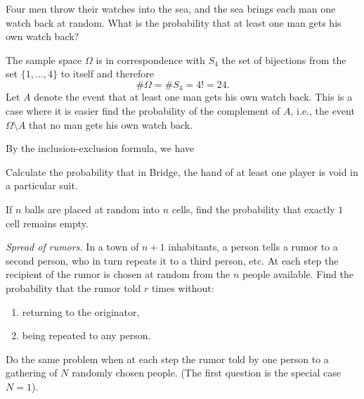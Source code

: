 \begin{problem}[Handout 2, \# 5]
  Four men throw their watches into the sea, and the sea brings each man
  one watch back at random. What is the probability that at least one man
  gets his own watch back?
\end{problem}
\begin{solution}
  The sample space \(\Omega\) is in correspondence with \(S_4\) the set of
  bijections from the set \(\{1,\dotsc,4\}\) to itself and therefore
  \begin{equation}
    \label{eq:2-1}
    \#\Omega=\# S_4=4!=24.
  \end{equation}
  Let \(A\) denote the event that at least one man gets his own watch
  back. This is a case where it is easier find the probability of the
  complement of \(A\), i.e., the event \(\Omega\setminus A\) that no man
  gets his own watch back.

  By the inclusion-exclusion formula, we have
\end{solution}
\newpage

\begin{problem}[Handout 2, \#7]
  Calculate the probability that in Bridge, the hand of at least one player
  is void in a particular suit.
\end{problem}
\begin{solution}
\end{solution}
\newpage

\begin{problem}[Handout 2, \# 12]
  If \(n\) balls are placed at random into \(n\) cells, find the
  probability that exactly \(1\) cell remains empty.
\end{problem}
\begin{solution}
\end{solution}
\newpage


\begin{problem}[Handout 2, \# 13]
  \emph{Spread of rumors.} In a town of \(n+1\) inhabitants, a person tells
  a rumor to a second person, who in turn repeats it to a third person,
  etc. At each step the recipient of the rumor is chosen at random from the
  \(n\) people available. Find the probability that the rumor told \(r\)
  times without:
  \begin{enumerate}[label=(\alph*),noitemsep]
  \item returning to the originator,
  \item being repeated to any person.
  \end{enumerate}
  Do the same problem when at each step the rumor told by one person to a
  gathering of \(N\) randomly chosen people. (The first question is the
  special case \(N=1\)).
\end{problem}
\begin{solution}

\end{solution}
\newpage

